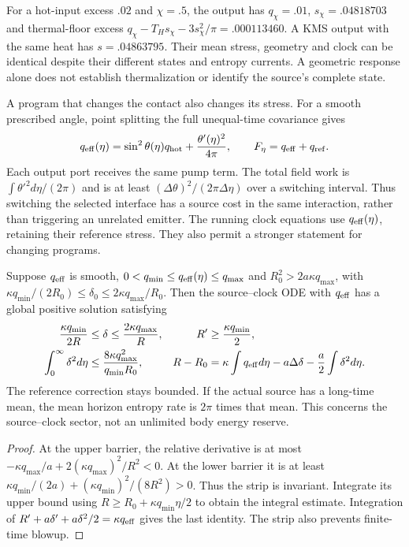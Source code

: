 For a hot-input excess $.02$ and $\chi=.5$, the output has
$q_\chi=.01$, $s_\chi=.04818703$ and thermal-floor excess
$q_\chi-T_Hs_\chi-3s_\chi^2/\pi=.000113460$.
A KMS output with the same heat has $s=.04863795$.
Their mean stress, geometry and clock can be identical despite their
different states and entropy currents. A geometric response alone does
not establish thermalization or identify the source's complete state.

A program that changes the contact also changes its stress. For a
smooth prescribed angle, point splitting the full unequal-time
covariance gives
\begin{equation}\label{eq:local-source-pump}
 q_{\rm eff}(\eta)=\sin^2\theta(\eta)q_{\rm hot}
                  +\frac{\theta'(\eta)^2}{4\pi},\qquad
 F_\eta=q_{\rm eff}+q_{\rm ref}.
\end{equation}
Each output port receives the same pump term. The total field work is
$\int\theta'^2d\eta/(2\pi)$ and is at least
$(\Delta\theta)^2/(2\pi\Delta\eta)$ over a switching interval.
Thus switching the selected interface has a source cost in the same
interaction, rather than triggering an unrelated emitter. The running
clock equations use $q_{\rm eff}(\eta)$, retaining their reference
stress. They also permit a stronger statement for changing programs.

\begin{proposition}
\label{prop:changing-source-clock}
Suppose $q_{\rm eff}$ is smooth,
$0<q_{\min}\le q_{\rm eff}(\eta)\le q_{\max}$ and
$R_0^2>2a\kappa q_{\max}$, with
$\kappa q_{\min}/(2R_0)\le\delta_0\le2\kappa q_{\max}/R_0$.
Then the source--clock ODE with $q_{\rm eff}$ has a global positive
solution satisfying
\begin{align}\label{eq:changing-source-growth}
 \frac{\kappa q_{\min}}{2R}&\le\delta\le
                 \frac{2\kappa q_{\max}}R,&
 R'&\ge\frac{\kappa q_{\min}}2,\nonumber\\
 \int_0^\infty\delta^2d\eta&\le
       \frac{8\kappa q_{\max}^2}{q_{\min}R_0},&
 R-R_0&=\kappa\int q_{\rm eff}d\eta
             -a\Delta\delta-\frac a2\int\delta^2d\eta.
\end{align}
The reference correction stays bounded. If the actual source has a
long-time mean, the mean horizon entropy rate is $2\pi$ times that
mean. This concerns the source--clock sector, not an unlimited body
energy reserve.
\end{proposition}
\begin{proof}
At the upper barrier, the relative derivative is at most
$-\kappa q_{\max}/a+2(\kappa q_{\max})^2/R^2<0$.
At the lower barrier it is at least
$\kappa q_{\min}/(2a)+(\kappa q_{\min})^2/(8R^2)>0$.
Thus the strip is invariant. Integrate its upper bound using
$R\ge R_0+\kappa q_{\min}\eta/2$ to obtain the integral estimate.
Integration of $R'+a\delta'+a\delta^2/2=\kappa q_{\rm eff}$ gives
the last identity. The strip also prevents finite-time blowup.
\end{proof}

